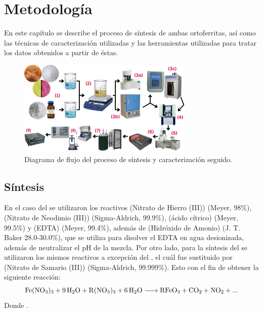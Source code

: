 \documentclass[../main.tex]{subfiles}
\begin{document}
\chapter{Metodología} \label{cap:metodologia}
En este capítulo se describe el proceso de síntesis de ambas ortoferritas, así como las técnicas de caracterización utilizadas y las herramientas utilizadas para tratar los datos obtenidos a partir de éstas.
\begin{figure}[H]
    \centering
    \includegraphics[width=0.75\textwidth]{fig/2.png}
    \caption{Diagrama de flujo del proceso de síntesis y caracterización seguido.}
    \label{fig:diagflujosint}
\end{figure}
\section{Síntesis}
En el caso del \neod{} se utilizaron los reactivos  (Nitrato de Hierro (III)) (Meyer, 98\%),  (Nitrato de Neodimio (III)) (Sigma-Aldrich, 99.9\%),  (ácido cítrico) (Meyer, 99.5\%) y  (EDTA) (Meyer, 99.4\%), además de  (Hidróxido de Amonio) (J. T. Baker 28.0-30.0\%), que se utiliza para disolver el EDTA en agua desionizada, además de neutralizar el pH de la mezcla. Por otro lado, para la síntesis del \sama{} se utilizaron los mismos reactivos a excepción del , el cuál fue sustituido por  (Nitrato de Samario (III)) (Sigma-Aldrich, 99.999\%). Esto con el fin de obtener la siguiente reacción:
\begin{equation}
    \ce{Fe(NO3)3 + 9H2O + R(NO3)3 + 6H2O -> RFeO3 + CO2 + NO2 + ...}
    \label{eq:reaccion}
\end{equation}
Donde .
\end{document}
